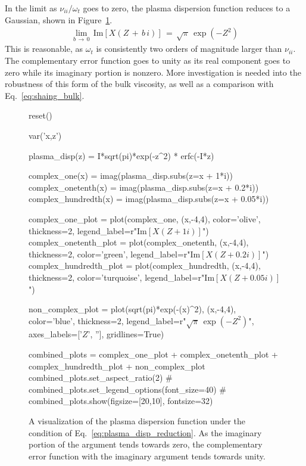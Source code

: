 In the limit as $\nu_{ii} / \omega_t$ goes to zero, the plasma dispersion function reduces to a Gaussian, shown in Figure~\ref{fig:bulk_definition_comparison}.
\begin{align} %
	\lim_{b \,\to\, 0} \, \text{Im}\left[X(Z \,+\, b\,i)\right] \,=\, \sqrt{\pi} \,
		\exp(-Z^2) \label{eq:plasma_disp_reduction}
\end{align}
This is reasonable, as $\omega_t$ is consistently two orders of magnitude larger than $\nu_{ii}$.
The complementary error function goes to unity as its real component goes to zero while its imaginary portion is nonzero.
More investigation is needed into the robustness of this form of the bulk viscosity, as well as a comparison with Eq.~\ref{eq:shaing_bulk}.
\begin{figure}[tb] %
	\centering
	\begin{sagesilent}
	reset()

	var('x,z')

	plasma_disp(z) = I*sqrt(pi)*exp(-z^2) * erfc(-I*z)

	complex_one(x) = imag(plasma_disp.subs(z=x + 1*i))
	complex_onetenth(x) = imag(plasma_disp.subs(z=x + 0.2*i))
	complex_hundredth(x) = imag(plasma_disp.subs(z=x + 0.05*i))

	complex_one_plot = plot(complex_one, (x,-4,4), color='olive', thickness=2, legend_label=r"Im$[X(Z + 1i)]$")
	complex_onetenth_plot = plot(complex_onetenth, (x,-4,4), thickness=2, color='green', legend_label=r"Im$[X(Z + 0.2i)]$")
	complex_hundredth_plot = plot(complex_hundredth, (x,-4,4), thickness=2, color='turquoise', legend_label=r"Im$[X(Z + 0.05i)]$")

	non_complex_plot = plot(sqrt(pi)*exp(-(x)^2), (x,-4,4), color='blue', thickness=2, legend_label=r"$\sqrt{\pi} \, \exp(-Z^2)$", axes_labels=['$Z$', ''], gridlines=True)

	combined_plots = complex_one_plot + complex_onetenth_plot + complex_hundredth_plot + non_complex_plot
	combined_plots.set_aspect_ratio(2)
#	combined_plots.set_legend_options(font_size=40)
#	combined_plots.show(figsize=[20,10], fontsize=32)
	\end{sagesilent}

	\caption{A visualization of the plasma dispersion function under the condition of Eq.~\ref{eq:plasma_disp_reduction}.
	As the imaginary portion of the argument tends towards zero, the complementary error function with the imaginary argument tends towards unity.}
	\label{fig:bulk_definition_comparison}
\end{figure}

